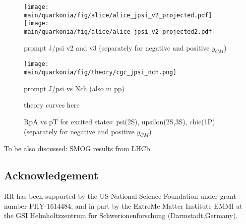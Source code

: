 \documentclass[../report.tex]{subfiles}
\providecommand{\main}{..}
\begin{document}
\begin{figure}
 \begin{center}
  \texttt{[image: \\main/quarkonia/fig/alice/alice\_jpsi\_v2\_projected.pdf]}
  \texttt{[image: \\main/quarkonia/fig/alice/alice\_jpsi\_v2\_projected2.pdf]}
 \end{center}

 \caption{prompt J/psi v2 and v3 (separately for negative and positive $y_{CM}$)}
\end{figure}

\begin{figure}
 \begin{center}
  \texttt{[image: \\main/quarkonia/fig/theory/cgc\_jpsi\_nch.png]}
 \end{center}

 \caption{prompt J/psi vs Nch (also in pp)~\cite{Ma:2018bax}}
\end{figure}

\begin{figure}
 \begin{center}
 theory curves here
 \end{center}

 \caption{RpA vs pT for excited states: psi(2S), upsilon(2S,3S), chic(1P) (separately for negative and positive $y_{CM}$)}
\end{figure}

To be also discussed: SMOG results from LHCb.

\subsection*{Acknowledgement}
RR has been supported by the US National Science Foundation under
grant number PHY-1614484, and in part by the ExtreMe Matter Institute EMMI at 
the GSI Helmholtzzentrum f\"{u}r Schwerionenforschung (Darmstadt,Germany).
\end{document}
